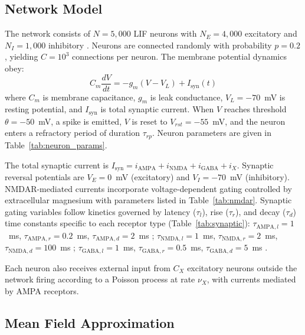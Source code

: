 \documentclass[10pt]{article}
\begin{document}
\subsection{Network Model}

The network consists of $N = 5{,}000$ LIF neurons with $N_E = 4{,}000$ excitatory and $N_I = 1{,}000$ inhibitory \citep{abeles1991corticonics}. Neurons are connected randomly with probability $p = 0.2$, yielding $C = 10^3$ connections per neuron. The membrane potential dynamics obey:
\begin{equation}
C_m \frac{dV}{dt} = -g_m(V - V_L) + I_{\mathrm{syn}}(t)
\label{eq:lif}
\end{equation}
where $C_m$ is membrane capacitance, $g_m$ is leak conductance, $V_L = -70$~mV is resting potential, and $I_{\mathrm{syn}}$ is total synaptic current. When $V$ reaches threshold $\theta = -50$~mV, a spike is emitted, $V$ is reset to $V_{rst} = -55$~mV, and the neuron enters a refractory period of duration $\tau_{rp}$. Neuron parameters are given in Table~\ref{tab:neuron_params}.

The total synaptic current is $I_{\mathrm{syn}} = i_{\mathrm{AMPA}} + i_{\mathrm{NMDA}} + i_{\mathrm{GABA}} + i_X$. Synaptic reversal potentials are $V_E = 0$~mV (excitatory) and $V_I = -70$~mV (inhibitory). NMDAR-mediated currents incorporate voltage-dependent gating controlled by extracellular magnesium \citep{jahr1990voltage} with parameters listed in Table~\ref{tab:nmdar}. Synaptic gating variables follow kinetics governed by latency ($\tau_l$), rise ($\tau_r$), and decay ($\tau_d$) time constants specific to each receptor type (Table~\ref{tab:synaptic}): $\tau_{\mathrm{AMPA},l} = 1$~ms, $\tau_{\mathrm{AMPA},r} = 0.2$~ms, $\tau_{\mathrm{AMPA},d} = 2$~ms \citep{zhou1998ampa}; $\tau_{\mathrm{NMDA},l} = 1$~ms, $\tau_{\mathrm{NMDA},r} = 2$~ms, $\tau_{\mathrm{NMDA},d} = 100$~ms \citep{hestrin1990analysis}; $\tau_{\mathrm{GABA},l} = 1$~ms, $\tau_{\mathrm{GABA},r} = 0.5$~ms, $\tau_{\mathrm{GABA},d} = 5$~ms \citep{gupta2000organizing}.

Each neuron also receives external input from $C_X$ excitatory neurons outside the network firing according to a Poisson process at rate $\nu_X$, with currents mediated by AMPA receptors.

\subsection{Mean Field Approximation}
\end{document}
